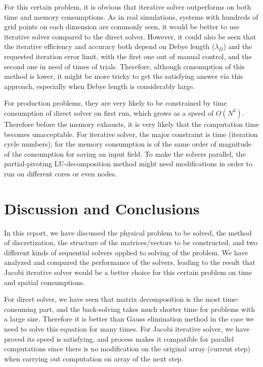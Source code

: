 \documentclass{article}
\begin{document}
\begin{spacing}{1.1}
For this certain problem, it is obvious that iterative solver outperforms on both time and memory consumptions. As in real simulations, systems with hundreds of grid points on each dimension are commonly seen, it would be better to use iterative solver compared to the direct solver. However, it could also be seen that the iterative efficiency and accuracy both depend on Debye length ($\lambda_D$) and the requested iteration error limit, with the first one out of manual control, and the second one in need of times of trials. Therefore, although consumption of this method is lower, it might be more tricky to get the satisfying answer via this approach, especially when Debye length is considerably large.

For production problems, they are very likely to be constrained by time consumption of direct solver on first run, which grows as a speed of $O(N^3)$. Therefore before the memory exhausts, it is very likely that the computation time becomes unacceptable. For iterative solver, the major constraint is time (iteration cycle numbers), for the memory consumption is of the same order of magnitude of the consumption for saving an input field. To make the solvers parallel, the partial-pivoting LU-decomposition method might need modifications in order to run on different cores or even nodes.

\section{Discussion and Conclusions}

In this report, we have discussed the physical problem to be solved, the method of discretization, the structure of the matrices/vectors to be constructed, and two different kinds of sequential solvers applied to solving of the problem. We have analyzed and compared the performance of the solvers, leading to the result that Jacobi iterative solver would be a better choice for this certain problem on time and spatial consumptions.

For direct solver, we have seen that matrix decomposition is the most time-consuming part, and the back-solving takes much shorter time for problems with a large size. Therefore it is better than Gauss elimination method in the case we need to solve this equation for many times. For Jacobi iterative solver, we have proved its speed is satisfying, and process makes it compatible for parallel computations since there is no modification on the original array (current step) when carrying out computation on array of the next step.


\end{spacing}
\end{document}
